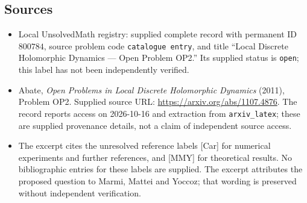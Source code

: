 \documentclass[11pt]{article}
\begin{document}
\subsection{Sources}
\begin{itemize}
\item Local UnsolvedMath registry: supplied complete record with permanent ID \(800784\), source problem code \texttt{catalogue entry}, and title ``Local Discrete Holomorphic Dynamics --- Open Problem OP2.'' Its supplied status is \texttt{open}; this label has not been independently verified.
\item Abate, \emph{Open Problems in Local Discrete Holomorphic Dynamics} (2011), Problem OP2. Supplied source URL: \url{https://arxiv.org/abs/1107.4876}. The record reports access on 2026-10-16 and extraction from \texttt{arxiv\_latex}; these are supplied provenance details, not a claim of independent source access.
\item The excerpt cites the unresolved reference labels [Car] for numerical experiments and further references, and [MMY] for theoretical results. No bibliographic entries for these labels are supplied. The excerpt attributes the proposed question to Marmi, Mattei and Yoccoz; that wording is preserved without independent verification.
\end{itemize}
\end{document}

